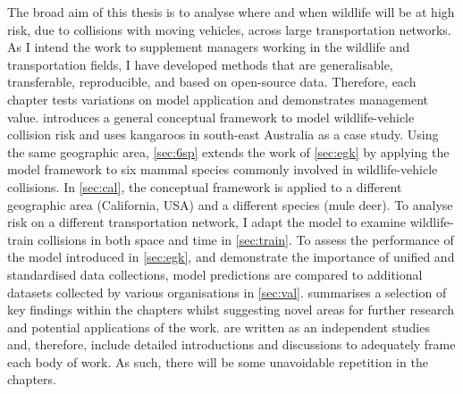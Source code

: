 The broad aim of this thesis is to analyse where and when wildlife will be at high risk, due to collisions with moving vehicles, across large transportation networks. As I intend the work to supplement managers working in the wildlife and transportation fields, I have developed methods that are generalisable, transferable, reproducible, and based on open-source data. Therefore, each chapter tests variations on model application and demonstrates management value.  introduces a general conceptual framework to model wildlife-vehicle collision risk and uses kangaroos in south-east Australia as a case study. Using the same geographic area, \cref{sec:6sp} extends the work of \cref{sec:egk} by applying the model framework to six mammal species commonly involved in wildlife-vehicle collisions. In \cref{sec:cal}, the conceptual framework is applied to a different geographic area (California, USA) and a different species (mule deer). To analyse risk on a different transportation network, I adapt the model to examine wildlife-train collisions in both space and time in \cref{sec:train}. To assess the performance of the model introduced in \cref{sec:egk}, and demonstrate the importance of unified and standardised data collections, model predictions are compared to additional datasets collected by various organisations in \cref{sec:val}.  summarises a selection of key findings within the chapters whilst suggesting novel areas for further research and potential applications of the work.  are written as an independent studies and, therefore, include detailed introductions and discussions to adequately frame each body of work. As such, there will be some unavoidable repetition in the chapters.